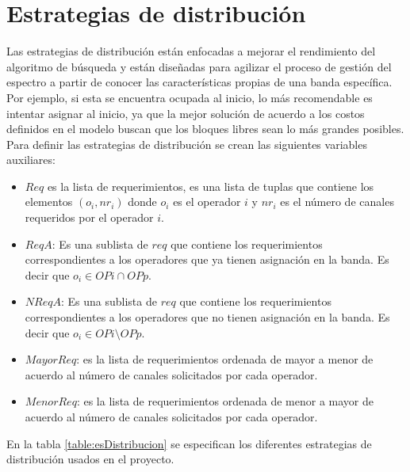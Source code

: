 
\section{Estrategias de distribución}

Las estrategias de distribución están enfocadas a mejorar el rendimiento del algoritmo de búsqueda y están diseñadas para agilizar el proceso de gestión del espectro a partir de conocer las características propias de una banda específica. Por ejemplo, si esta se encuentra ocupada al inicio, lo más recomendable es intentar asignar al inicio, ya que la mejor solución de acuerdo a los costos definidos en el modelo buscan que los bloques libres sean lo más grandes posibles.\\

Para definir las estrategias de distribución se crean las siguientes variables auxiliares:

\begin{itemize}
	\item $Req$ es la lista de requerimientos, es una lista de tuplas que contiene los elementos $(o_{i}, nr_{i})$ donde $o_{i}$ es el operador $i$ y $nr_{i}$ es el número de canales requeridos por el operador $i$.
	\item $ReqA$: Es una sublista de $req$ que contiene los requerimientos correspondientes a los operadores que ya tienen asignación en la banda. Es decir que $o_{i} \in OPi \cap OPp$.
	\item $NReqA$: Es una sublista de $req$ que contiene los requerimientos correspondientes a los operadores que no tienen asignación en la banda. Es decir que $o_{i} \in OPi \setminus OPp$.
	\item $MayorReq$: es la lista de requerimientos ordenada de mayor a menor de acuerdo al número de canales solicitados por cada operador.
	\item $MenorReq$: es la lista de requerimientos ordenada de menor a mayor de acuerdo al número de canales solicitados por cada operador.
\end{itemize}


En la tabla \ref{table:esDistribucion} se especifican los diferentes estrategias de distribución usados en el proyecto.

